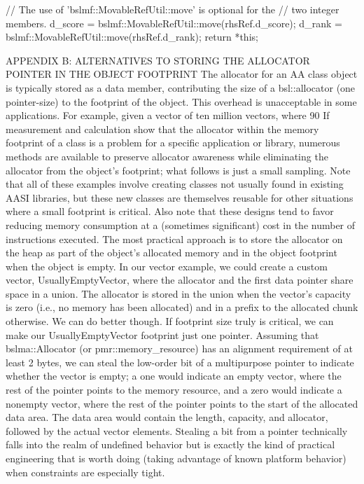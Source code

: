 {{{{{{{{{    // The use of 'bslmf::MovableRefUtil::move' is optional for the
    // two integer members. 
    d_score = bslmf::MovableRefUtil::move(rhsRef.d_score);
    d_rank  = bslmf::MovableRefUtil::move(rhsRef.d_rank);
    return *this;
}

APPENDIX B: ALTERNATIVES TO STORING THE ALLOCATOR POINTER 
IN THE OBJECT FOOTPRINT
The allocator for an AA class object is typically stored as a data member, contributing the size of a bsl::allocator (one pointer-size) to the footprint of the object. This overhead is unacceptable in some applications. For example, given a vector of ten million vectors, where 90%
If measurement and calculation show that the allocator within the memory footprint of a class is a problem for a specific application or library, numerous methods are available to preserve allocator awareness while eliminating the allocator from the object’s footprint; what follows is just a small sampling. Note that all of these examples involve creating classes not usually found in existing AASI libraries, but these new classes are themselves reusable for other situations where a small footprint is critical. Also note that these designs tend to favor reducing memory consumption at a (sometimes significant) cost in the number of instructions executed.
The most practical approach is to store the allocator on the heap as part of the object’s allocated memory and in the object footprint when the object is empty. In our vector example, we could create a custom vector, UsuallyEmptyVector,  where the allocator and the first data pointer share space in a union. The allocator is stored in the union when the vector’s capacity is zero (i.e., no memory has been allocated) and in a prefix to the allocated chunk otherwise. We can do better though. If footprint size truly is critical, we can make our UsuallyEmptyVector footprint just one pointer. Assuming that bslma::Allocator (or pmr::memory_resource) has an alignment requirement of at least 2 bytes, we can steal the low-order bit of a multipurpose pointer to indicate whether the vector is empty; a one would indicate an empty vector, where the rest of the pointer points to the memory resource, and a zero would indicate a nonempty vector, where the rest of the pointer points to the start of the allocated data area. The data area would contain the length, capacity, and allocator, followed by the actual vector elements. Stealing a bit from a pointer technically falls into the realm of undefined behavior but is exactly the kind of practical engineering that is worth doing (taking advantage of known platform behavior) when constraints are especially tight.
}}}}}}}}
